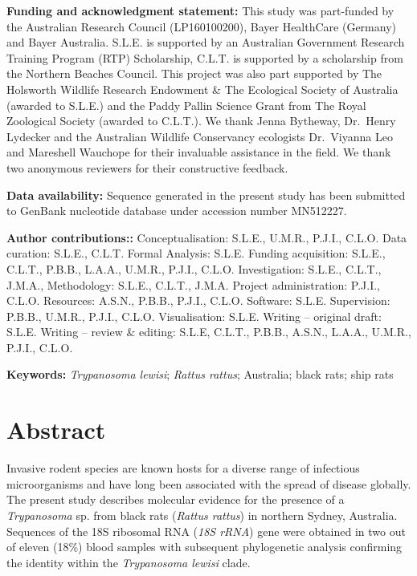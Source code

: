 \documentclass[a4paper, nobind]{templates/ociamthesis}
\begin{document}
\vspace{5mm}

\textbf{Funding and acknowledgment statement:} This study was part-funded by the Australian Research Council (LP160100200), Bayer HealthCare (Germany) and Bayer Australia. S.L.E. is supported by an Australian Government Research Training Program (RTP) Scholarship, C.L.T. is supported by a scholarship from the Northern Beaches Council. This project was also part supported by The Holsworth Wildlife Research Endowment \& The Ecological Society of Australia (awarded to S.L.E.) and the Paddy Pallin Science Grant from The Royal Zoological Society (awarded to C.L.T.). We thank Jenna Bytheway, Dr.~Henry Lydecker and the Australian Wildlife Conservancy ecologists Dr.~Viyanna Leo and Mareshell Wauchope for their invaluable assistance in the field. We thank two anonymous reviewers for their constructive feedback.

\vspace{5mm}

\textbf{Data availability:}
Sequence generated in the present study has been submitted to GenBank nucleotide database under accession number MN512227.

\vspace{5mm}

\textbf{Author contributions::}
Conceptualisation: S.L.E., U.M.R., P.J.I., C.L.O.
Data curation: S.L.E., C.L.T.
Formal Analysis: S.L.E.
Funding acquisition: S.L.E., C.L.T., P.B.B., L.A.A., U.M.R., P.J.I., C.L.O.
Investigation: S.L.E., C.L.T., J.M.A.,
Methodology: S.L.E., C.L.T., J.M.A.
Project administration: P.J.I., C.L.O.
Resources: A.S.N., P.B.B., P.J.I., C.L.O.
Software: S.L.E.
Supervision: P.B.B., U.M.R., P.J.I., C.L.O.
Visualisation: S.L.E.
Writing -- original draft: S.L.E.
Writing -- review \& editing: S.L.E, C.L.T., P.B.B., A.S.N., L.A.A., U.M.R., P.J.I., C.L.O.

\vspace{5mm}

\textbf{Keywords:} \emph{Trypanosoma lewisi}; \emph{Rattus rattus}; Australia; black rats; ship rats

\newpage

\hypertarget{abstract-3}{%
\section{Abstract}\label{abstract-3}}

Invasive rodent species are known hosts for a diverse range of infectious microorganisms and have long been associated with the spread of disease globally. The present study describes molecular evidence for the presence of a \emph{Trypanosoma} sp. from black rats (\emph{Rattus rattus}) in northern Sydney, Australia. Sequences of the 18S ribosomal RNA (\emph{18S rRNA}) gene were obtained in two out of eleven (18\%) blood samples with subsequent phylogenetic analysis confirming the identity within the \emph{Trypanosoma lewisi} clade.
\end{document}
